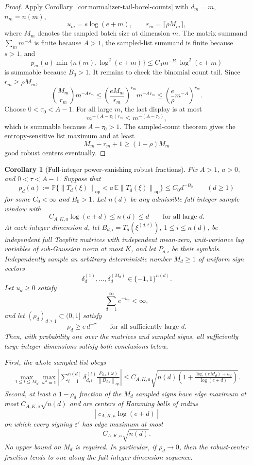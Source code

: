 \documentclass[11pt]{amsart}
\numberwithin{equation}{section}
\newtheorem{corollary}[theorem]{Corollary}
\theoremstyle{definition}
\theoremstyle{remark}
\newcommand{\op}{\mathrm{op}}
\newcommand{\Prob}{\mathbb P}
\newcommand{\Exp}{\mathbb E}
\newcommand{\norm}[1]{\left\lVert #1\right\rVert}
\newcommand{\eps}{\varepsilon}
\begin{document}
\begin{proof}
Apply Corollary~\ref{cor:normalizer-tail-borel-counts} with \(d_m=m\),
\(n_m=n(m)\),
\[
  u_m=s\log(e+m),\qquad r_m=\lceil\rho M_m\rceil ,
\]
where \(M_m\) denotes the sampled batch size at dimension \(m\).  The matrix
summand \(\sum_m m^{-A}\) is finite because \(A>1\), the sampled-list summand is
finite because \(s>1\), and
\[
  p_m(a)\min\{n(m),\log^2(e+m)\}
  \le C_0m^{-B_0}\log^2(e+m)
\]
is summable because \(B_0>1\).  It remains to check the binomial count tail.
Since \(r_m\ge\rho M_m\),
\[
  \binom{M_m}{r_m}m^{-A r_m}
  \le \left(\frac{eM_m}{r_m}\right)^{r_m}m^{-A r_m}
  \le \left(\frac{e}{\rho}m^{-A}\right)^{r_m}.
\]
Choose \(0<\tau_0<A-1\).  For all large \(m\), the last display is at most
\[
  m^{-(A-\tau_0)r_m}\le m^{-(A-\tau_0)},
\]
which is summable because \(A-\tau_0>1\).  The sampled-count theorem gives the
entropy-sensitive list maximum and at least
\[
  M_m-r_m+1\ge (1-\rho)M_m
\]
good robust centers eventually.
\end{proof}

\begin{corollary}[Full-integer power-vanishing robust fractions]
\label{cor:normalizer-tail-borel-all-dim-vanishing-fractions}
Fix \(A>1\), \(a>0\), and \(0<\tau<A-1\).  Suppose that
\[
  p_d(a):=\Prob\{\norm{T_d(\xi)}_{\op}<a\,\Exp\norm{T_d(\xi)}_{\op}\}
  \le C_0d^{-B_0}\qquad(d\ge1)
\]
for some \(C_0<\infty\) and \(B_0>1\).  Let \(n(d)\) be any admissible full
integer sample window with
\[
  C_{A,K,a}\log(e+d)\le n(d)\le d
  \qquad\text{for all large }d .
\]
At each integer dimension \(d\), let \(B_{d,i}=T_d(\xi^{(d,i)})\),
\(1\le i\le n(d)\), be independent full Toeplitz matrices with independent
mean-zero, unit-variance lag variables of sub-Gaussian norm at most \(K\), and
let \(P_{d,i}\) be their symbols.  Independently sample an arbitrary
deterministic number \(M_d\ge1\) of uniform sign vectors
\[
  \delta_d^{(1)},\ldots,\delta_d^{(M_d)}\in\{-1,1\}^{n(d)} .
\]
Let \(u_d\ge0\) satisfy
\[
  \sum_{d=1}^{\infty}e^{-u_d}<\infty ,
\]
and let \((\rho_d)_{d\ge1}\subset(0,1]\) satisfy
\[
  \rho_d\ge e\,d^{-\tau}
  \qquad\text{for all sufficiently large }d .
\]
Then, with probability one over the matrices and sampled signs, all
sufficiently large integer dimensions satisfy both conclusions below.

First, the whole sampled list obeys
\[
\begin{aligned}
  \max_{1\le t\le M_d}\max_{\omega^d=1}
  \left|\sum_{i=1}^{n(d)}\delta_{d,i}^{(t)}
  \frac{P_{d,i}(\omega)}{\norm{B_{d,i}}_{\op}}\right|
  \le
  C_{A,K,a}\sqrt{
    n(d)\left(1+\frac{\log(eM_d)+u_d}{\log(e+d)}\right)} .
\end{aligned}
\]
Second, at least a \(1-\rho_d\) fraction of the \(M_d\) sampled signs have edge
maximum at most \(C_{A,K,a}\sqrt{n(d)}\) and are centers of Hamming balls of
radius
\[
  \left\lfloor c_{A,K,a}\log(e+d)\right\rfloor
\]
on which every signing \(\eps'\) has edge maximum at most
\[
  C_{A,K,a}\sqrt{n(d)} .
\]
No upper bound on \(M_d\) is required.  In particular, if \(\rho_d\to0\), then
the robust-center fraction tends to one along the full integer dimension
sequence.
\end{corollary}
\end{document}
